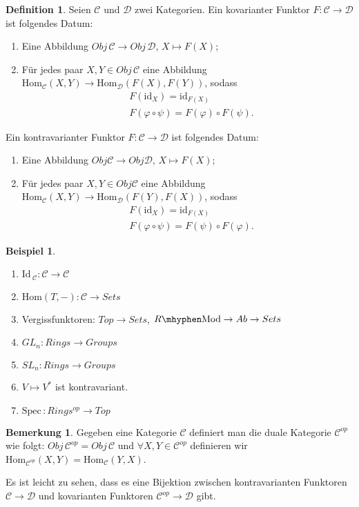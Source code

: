 \documentclass[reqno,12pt]{article}
\numberwithin{equation}{section}
\newcommand{\cC}{\mathcal{C}}
\newcommand{\cD}{\mathcal{D}}
\newcommand{\Spec}{\text{Spec}\,}
\newcommand{\Id}{\text{Id}\,}
\newcommand{\id}{\text{id}}
\newcommand{\Hom}{\text{Hom}}
\theoremstyle{plain}
\theoremstyle{definition}
\newtheorem{definition}[thm]{Definition}
\newtheorem{example}[thm]{Beispiel}
\newtheorem{remark}[thm]{Bemerkung}
\newcommand{\blank}{{-}}
\newcommand{\Mod}{\text{Mod}}
\begin{document}
\begin{definition}
Seien $\cC$ und $\cD$ zwei Kategorien. Ein {\sf kovarianter Funktor} $F \colon \cC \to \cD$ ist folgendes Datum:
\begin{enumerate}
\item Eine Abbildung $Obj\, \cC \to Obj\, \cD$, $X \mapsto F(X)$;
\item Für jedes paar $X,Y \in Obj\, \cC$ eine Abbildung $\Hom_{\cC}(X,Y) \to \Hom_{\cD}(F(X),F(Y))$, sodass
  \begin{align*}
  & F(\id_X) = \id_{F(X)} \\
  & F(\varphi \circ \psi) = F(\varphi) \circ F(\psi).
  \end{align*}
\end{enumerate}

\noindent Ein {\sf kontravarianter Funktor} $F \colon \cC \to \cD$ ist folgendes Datum:
\begin{enumerate}
  \item Eine Abbildung $Obj \cC \to Obj \cD$, $X \mapsto F(X)$;
  \item Für jedes paar $X,Y \in Obj \cC$ eine Abbildung $\Hom_{\cC}(X,Y) \to \Hom_{\cD}(F(Y),F(X))$, sodass
  \begin{align*}
  & F(\id_X) = \id_{F(X)} \\
  & F(\varphi \circ \psi) =  F(\psi) \circ F(\varphi).
  \end{align*}
\end{enumerate}
\end{definition}

\begin{example}
\
\begin{enumerate}
  \item $\Id_{\cC} \colon \cC \to \cC$
  \item $\Hom(T,\blank)  \colon \cC \to Sets$

  \item Vergissfunktoren: $Top \to Sets$, $R \mhyphen \Mod \to Ab \to Sets$

  \item $GL_n \colon Rings \to Groups$
  \item $SL_n \colon Rings \to Groups$
  \item $V \mapsto V^*$ ist kontravariant.
  \item $\Spec \colon Rings^{op} \to Top$
\end{enumerate}
\end{example}

\begin{remark}
Gegeben eine Kategorie $\cC$ definiert man die duale Kategorie $\cC^{op}$ wie folgt: $Obj\, \cC^{op} = Obj\, \cC$ und $\forall X,Y \in \cC^{op}$ definieren wir $\Hom_{\cC^{op}}(X,Y)=\Hom_{\cC}(Y,X)$.

Es ist leicht zu sehen, dass es eine Bijektion zwischen kontravarianten Funktoren $\cC \to \cD$ und kovarianten Funktoren $\cC^{op} \to \cD$ gibt.
\end{remark}
\end{document}
